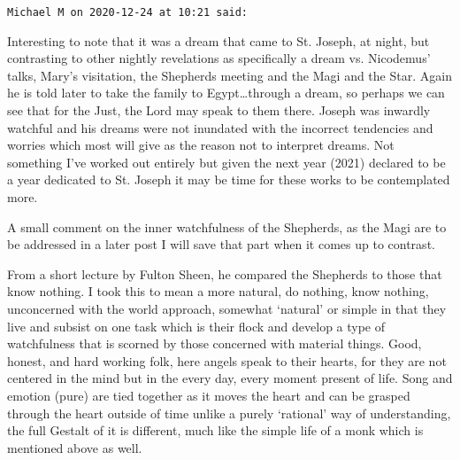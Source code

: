 \begin{footnotesize}
\begin{sffamily}
\hfill

\texttt{Michael M on 2020-12-24 at 10:21 said:}

Interesting to note that it was a dream that came to St. Joseph, at night, but contrasting to other nightly revelations as specifically a dream vs. Nicodemus' talks, Mary's visitation, the Shepherds meeting and the Magi and the Star. Again he is told later to take the family to Egypt…through a dream, so perhaps we can see that for the Just, the Lord may speak to them there. Joseph was inwardly watchful and his dreams were not inundated with the incorrect tendencies and worries which most will give as the reason not to interpret dreams. Not something I've worked out entirely but given the next year (2021) declared to be a year dedicated to St. Joseph it may be time for these works to be contemplated more.

A small comment on the inner watchfulness of the Shepherds, as the Magi are to be addressed in a later post I will save that part when it comes up to contrast.

From a short lecture by Fulton Sheen, he compared the Shepherds to those that know nothing. I took this to mean a more natural, do nothing, know nothing, unconcerned with the world approach, somewhat `natural' or simple in that they live and subsist on one task which is their flock and develop a type of watchfulness that is scorned by those concerned with material things. Good, honest, and hard working folk, here angels speak to their hearts, for they are not centered in the mind but in the every day, every moment present of life. Song and emotion (pure) are tied together as it moves the heart and can be grasped through the heart outside of time unlike a purely `rational' way of understanding, the full Gestalt of it is different, much like the simple life of a monk which is mentioned above as well.

\end{sffamily}\end{footnotesize}
